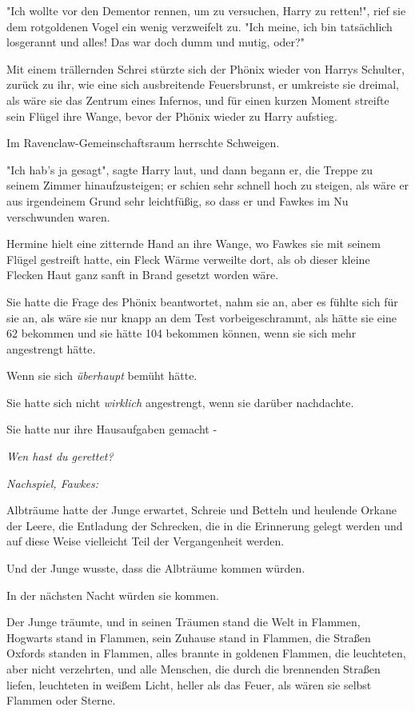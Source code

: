 {"Ich wollte vor den Dementor rennen, um zu versuchen, Harry zu retten!", rief sie dem rotgoldenen Vogel ein wenig verzweifelt zu. "Ich meine, ich bin tatsächlich losgerannt und alles! Das war doch dumm und mutig, oder?"

Mit einem trällernden Schrei stürzte sich der Phönix wieder von Harrys Schulter, zurück zu ihr, wie eine sich ausbreitende Feuersbrunst, er umkreiste sie dreimal, als wäre sie das Zentrum eines Infernos, und für einen kurzen Moment streifte sein Flügel ihre Wange, bevor der Phönix wieder zu Harry aufstieg.

Im Ravenclaw-Gemeinschaftsraum herrschte Schweigen.

"Ich hab's ja gesagt", sagte Harry laut, und dann begann er, die Treppe zu seinem Zimmer hinaufzusteigen; er schien sehr schnell hoch zu steigen, als wäre er aus irgendeinem Grund sehr leichtfüßig, so dass er und Fawkes im Nu verschwunden waren.

Hermine hielt eine zitternde Hand an ihre Wange, wo Fawkes sie mit seinem Flügel gestreift hatte, ein Fleck Wärme verweilte dort, als ob dieser kleine Flecken Haut ganz sanft in Brand gesetzt worden wäre.

Sie hatte die Frage des Phönix beantwortet, nahm sie an, aber es fühlte sich für sie an, als wäre sie nur knapp an dem Test vorbeigeschrammt, als hätte sie eine 62 bekommen und sie hätte 104 bekommen können, wenn sie sich mehr angestrengt hätte.

Wenn sie sich \emph{überhaupt} bemüht hätte.

Sie hatte sich nicht \emph{wirklich} angestrengt, wenn sie darüber nachdachte.

Sie hatte nur ihre Hausaufgaben gemacht -

\emph{Wen hast du gerettet?}

\emph{Nachspiel, Fawkes:}

Albträume hatte der Junge erwartet, Schreie und Betteln und heulende Orkane der Leere, die Entladung der Schrecken, die in die Erinnerung gelegt werden und auf diese Weise vielleicht Teil der Vergangenheit werden.

Und der Junge wusste, dass die Albträume kommen würden.

In der nächsten Nacht würden sie kommen.

Der Junge träumte, und in seinen Träumen stand die Welt in Flammen, Hogwarts stand in Flammen, sein Zuhause stand in Flammen, die Straßen Oxfords standen in Flammen, alles brannte in goldenen Flammen, die leuchteten, aber nicht verzehrten, und alle Menschen, die durch die brennenden Straßen liefen, leuchteten in weißem Licht, heller als das Feuer, als wären sie selbst Flammen oder Sterne.

}
